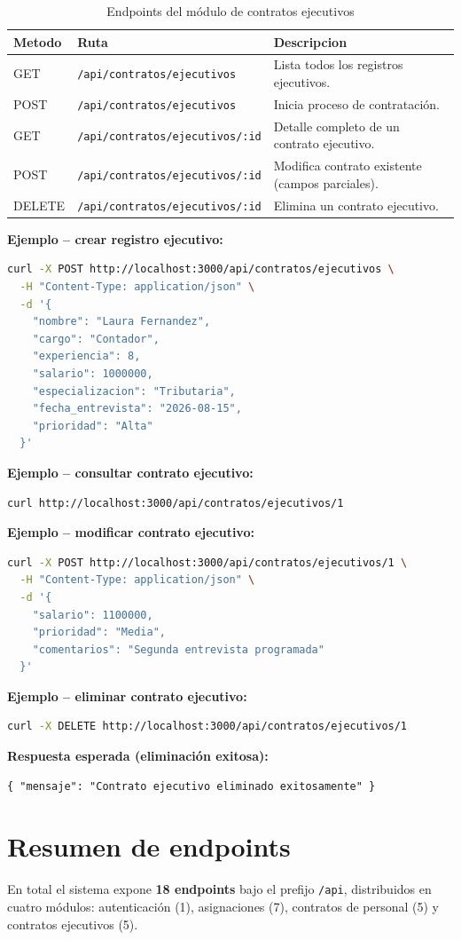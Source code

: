 \documentclass[12pt,a4paper]{report}
\begin{document}
\begin{longtable}{@{}p{1.5cm}p{4cm}p{6.5cm}@{}}
  \caption{Endpoints del módulo de contratos ejecutivos} \\
  \toprule
  \textbf{Metodo} & \textbf{Ruta} & \textbf{Descripcion} \\
  \midrule
  \endfirsthead
  GET & \scriptsize\texttt{/api/contratos/ejecutivos} & Lista todos los registros ejecutivos. \\
  POST & \scriptsize\texttt{/api/contratos/ejecutivos} & Inicia proceso de contratación. \\
  GET & \scriptsize\texttt{/api/contratos/ejecutivos/:id} & Detalle completo de un contrato ejecutivo. \\
  POST & \scriptsize\texttt{/api/contratos/ejecutivos/:id} & Modifica contrato existente (campos parciales). \\
  DELETE & \scriptsize\texttt{/api/contratos/ejecutivos/:id} & Elimina un contrato ejecutivo. \\
  \bottomrule
\end{longtable}

\textbf{Ejemplo -- crear registro ejecutivo:}
\begin{lstlisting}[language=bash]
curl -X POST http://localhost:3000/api/contratos/ejecutivos \
  -H "Content-Type: application/json" \
  -d '{
    "nombre": "Laura Fernandez",
    "cargo": "Contador",
    "experiencia": 8,
    "salario": 1000000,
    "especializacion": "Tributaria",
    "fecha_entrevista": "2026-08-15",
    "prioridad": "Alta"
  }'
\end{lstlisting}

\textbf{Ejemplo -- consultar contrato ejecutivo:}
\begin{lstlisting}[language=bash]
curl http://localhost:3000/api/contratos/ejecutivos/1
\end{lstlisting}

\textbf{Ejemplo -- modificar contrato ejecutivo:}
\begin{lstlisting}[language=bash]
curl -X POST http://localhost:3000/api/contratos/ejecutivos/1 \
  -H "Content-Type: application/json" \
  -d '{
    "salario": 1100000,
    "prioridad": "Media",
    "comentarios": "Segunda entrevista programada"
  }'
\end{lstlisting}

\textbf{Ejemplo -- eliminar contrato ejecutivo:}
\begin{lstlisting}[language=bash]
curl -X DELETE http://localhost:3000/api/contratos/ejecutivos/1
\end{lstlisting}

\textbf{Respuesta esperada (eliminación exitosa):}
\begin{lstlisting}
{ "mensaje": "Contrato ejecutivo eliminado exitosamente" }
\end{lstlisting}

\pagebreak
\section{Resumen de endpoints}

En total el sistema expone \textbf{18 endpoints} bajo el prefijo \texttt{/api}, distribuidos en cuatro módulos: autenticación (1), asignaciones (7), contratos de personal (5) y contratos ejecutivos (5).
\end{document}
